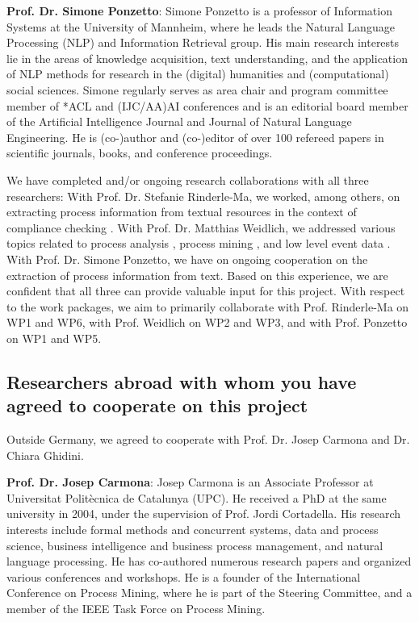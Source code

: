 \textbf{Prof. Dr. Simone Ponzetto}: Simone Ponzetto is a professor of Information Systems at the University of Mannheim, where he leads the Natural Language Processing (NLP) and Information Retrieval group. His main research interests lie in the areas of knowledge acquisition, text understanding, and the application of NLP methods for research in the (digital) humanities and (computational) social sciences. Simone regularly serves as area chair and program committee member of *ACL and (IJC/AA)AI conferences and is an editorial board member of the Artificial Intelligence Journal and Journal of Natural Language Engineering. He is (co-)author and (co-)editor of over 100 refereed papers in scientific journals, books, and conference proceedings.

We have completed and/or ongoing research collaborations with all three researchers:
With Prof. Dr. Stefanie Rinderle-Ma, we worked, among others, on extracting process information from textual resources in the context of compliance checking \cite{winter2020assessing}. 
With Prof. Dr. Matthias Weidlich, we addressed various topics related to process analysis \cite{leopold2012probabilistic,weidlich2013predicting}, process mining \cite{van2020partial,fahrenkrog2020pripel}, and low level event data \cite{zhao2021eires,busany2020interval}.
With Prof. Dr. Simone Ponzetto, we have on ongoing cooperation on  the extraction of process information from text. 
%
Based on this experience, we are confident that all three can provide valuable input for this project. With respect to the work packages, we aim to primarily collaborate with Prof. Rinderle-Ma on WP1 and WP6, with Prof. Weidlich on WP2 and WP3, and with Prof. Ponzetto on WP1 and WP5.


\subsection{Researchers abroad with whom you have agreed to cooperate on this project}
\label{sec:collab:abroad}

Outside Germany, we agreed to cooperate with Prof. Dr. Josep Carmona and Dr. Chiara Ghidini.

\textbf{Prof. Dr. Josep Carmona}: Josep Carmona is an Associate Professor at Universitat Politècnica de Catalunya (UPC). He received a PhD at the same university in 2004, under the supervision of Prof. Jordi Cortadella. His research interests include formal methods and concurrent systems, data and process science, business intelligence and business process management, and natural language processing. He has co-authored numerous research papers and organized various conferences and workshops. He is a founder of the International Conference on Process Mining, where he is part of the Steering Committee, and a member of the IEEE Task Force on Process Mining.


